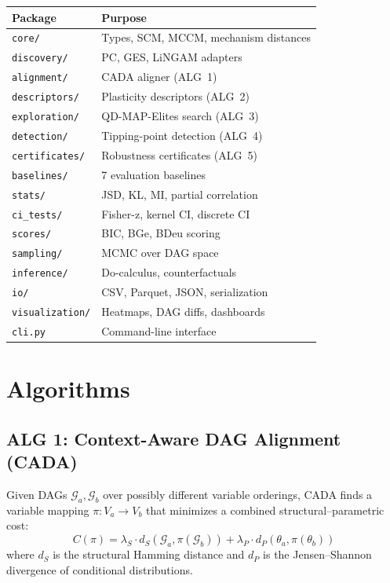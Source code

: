 \documentclass[11pt]{article}
\newcommand{\cada}{\textsc{CADA}}
\begin{document}
\begin{center}
\small
\begin{tabular}{ll}
\toprule
\textbf{Package} & \textbf{Purpose} \\
\midrule
\texttt{core/} & Types, SCM, MCCM, mechanism distances \\
\texttt{discovery/} & PC, GES, LiNGAM adapters \\
\texttt{alignment/} & CADA aligner (ALG~1) \\
\texttt{descriptors/} & Plasticity descriptors (ALG~2) \\
\texttt{exploration/} & QD-MAP-Elites search (ALG~3) \\
\texttt{detection/} & Tipping-point detection (ALG~4) \\
\texttt{certificates/} & Robustness certificates (ALG~5) \\
\texttt{baselines/} & 7 evaluation baselines \\
\texttt{stats/} & JSD, KL, MI, partial correlation \\
\texttt{ci\_tests/} & Fisher-z, kernel CI, discrete CI \\
\texttt{scores/} & BIC, BGe, BDeu scoring \\
\texttt{sampling/} & MCMC over DAG space \\
\texttt{inference/} & Do-calculus, counterfactuals \\
\texttt{io/} & CSV, Parquet, JSON, serialization \\
\texttt{visualization/} & Heatmaps, DAG diffs, dashboards \\
\texttt{cli.py} & Command-line interface \\
\bottomrule
\end{tabular}
\end{center}

\section{Algorithms}

\subsection{ALG 1: Context-Aware DAG Alignment (\cada{})}

Given DAGs $\mathcal{G}_a, \mathcal{G}_b$ over possibly different
variable orderings, \cada{} finds a variable mapping
$\pi: V_a \to V_b$ that minimizes a combined structural--parametric
cost:
\[
  C(\pi) = \lambda_S \cdot d_S(\mathcal{G}_a, \pi(\mathcal{G}_b))
          + \lambda_P \cdot d_P(\theta_a, \pi(\theta_b))
\]
where $d_S$ is the structural Hamming distance and $d_P$ is the
Jensen--Shannon divergence of conditional distributions.
\end{document}
